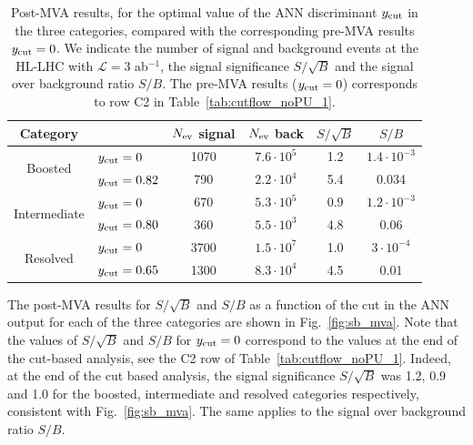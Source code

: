 \begin{table}[t]
  \centering
  \begin{tabular}{|c|l|c|c|c|c|}
    \hline
    Category  &   &  $N_{\rm ev}$ signal &  $N_{\rm ev}$ back  &  $S/\sqrt{B}$ & $S/B$ \\ 
    \hline
    \hline
    \multirow{2}{*}{Boosted} &  $y_{\rm cut}=0$  & 1070 & $7.6\cdot 10^5$  & 1.2  & $1.4\cdot 10^{-3}$  \\
    &  $y_{\rm cut}=0.82$ & 790  & $2.2\cdot 10^4$   & 5.4  & 0.034 \\
    \hline
    \hline
    \multirow{2}{*}{Intermediate} &  $y_{\rm cut}=0$  & 670   & $5.3\cdot 10^5$
    & 0.9 & $1.2\cdot 10^{-3}$ \\
    &  $y_{\rm cut}=0.80$ & 360  & $5.5\cdot 10^3$  & 4.8 & 0.06\\
    \hline
    \hline
      \multirow{2}{*}{Resolved} &  $y_{\rm cut}=0$  & 3700 &  $1.5\cdot 10^{7}$ &  1.0 &$3\cdot 10^{-4}$ \\
    &  $y_{\rm cut}=0.65$ & 1300  & $8.3\cdot 10^{4}$ & 4.5 & 0.01 \\
    \hline
      \end{tabular}
  \caption{\small Post-MVA results, for the optimal value of the
    ANN discriminant $y_{\rm cut}$ in the three categories, compared with the
    corresponding
    pre-MVA results $y_{\rm cut}=0$.
    We indicate the number of signal and
    background events
    at the HL-LHC with $\mathcal{L}=3$ ab$^{-1}$,
    the signal significance $S/\sqrt{B}$ and
    the signal over background ratio $S/B$.
    The pre-MVA results ($y_{\rm cut}=0$) corresponds to row C2 in
    Table~\ref{tab:cutflow_noPU_1}.
    \label{table:cutflowMVA}
  }
\end{table}

The post-MVA results for $S/\sqrt{B}$ and $S/B$ as a function of the cut
in the ANN output for each of the three categories are shown in
Fig.~\ref{fig:sb_mva}.
%
Note that the values of $S/\sqrt{B}$ and $S/B$
for $y_{\rm cut}=0$ correspond to the values at
the end of the cut-based analysis, see
the C2 row of Table~\ref{tab:cutflow_noPU_1}.
%
Indeed, at the end of the cut based analysis, the
signal significance $S/\sqrt{B}$ was
1.2, 0.9 and 1.0 for the boosted, intermediate and resolved
categories respectively, consistent with Fig.~\ref{fig:sb_mva}.
%
The same applies to the signal over background ratio $S/B$.

